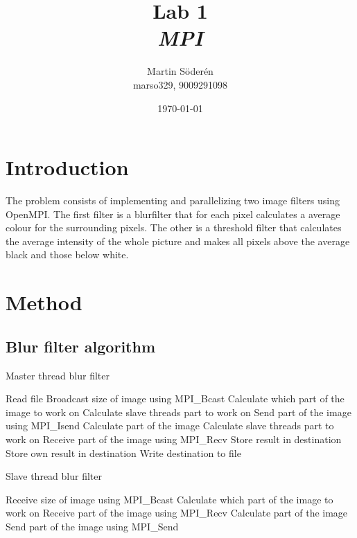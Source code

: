 \documentclass[10pt,twocolumn]{article}
\title{Lab 1\\ \emph{MPI}}
\author{Martin Söderén \\ marso329, 9009291098 }
\date{\today}
\begin{document}
\maketitle

\clearpage

\section{Introduction}

The problem consists of implementing and parallelizing two image filters using OpenMPI. The first filter is a blurfilter that for each pixel calculates a average colour for the surrounding pixels. The other is a threshold filter that calculates the average intensity of the whole picture and makes all pixels above the average black and those below white.

\section{Method}
\subsection{Blur filter algorithm}
\begin{algorithm}[H]
\caption{Master thread blur filter}
\label{alg:Master}
\begin{algorithmic}
\State Read file
\State Broadcast size of image using MPI\_Bcast
\State Calculate which part of the image to work on
\State Calculate slave threads part to work on
\State Send part of the image using MPI\_Isend
\EndFor
\State Calculate part of the image
\State Calculate slave threads part to work on
\State Receive part of the image using MPI\_Recv
\State Store result in destination
\EndFor
\State Store own result in destination
\State Write destination to file
\EndProcedure
\end{algorithmic}
\end{algorithm}

\begin{algorithm}[H]
\caption{Slave thread blur filter}
\label{alg:Slave}
\begin{algorithmic}
\State Receive size of image using MPI\_Bcast
\State Calculate which part of the image to work on
\State Receive part of the image using MPI\_Recv
\State Calculate part of the image
\State Send part of the image using MPI\_Send
\EndProcedure
\end{algorithmic}
\end{algorithm}
\end{document}
